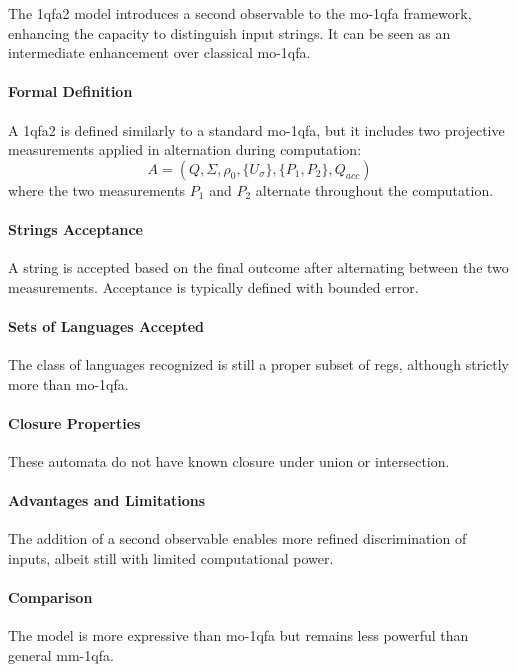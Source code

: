 \subsubsection{}
The \gls{1qfa2} model introduces a second observable to the \gls{mo-1qfa} framework, enhancing the capacity to distinguish input strings. It can be seen as an intermediate enhancement over classical \gls{mo-1qfa}.

\paragraph{Formal Definition}
A \gls{1qfa2} is defined similarly to a standard \gls{mo-1qfa}, but it includes two projective measurements applied in alternation during computation:
\[
A = (Q, \Sigma, \rho_0, \{U_{\sigma}\}, \{P_1, P_2\}, Q_{acc})
\]
where the two measurements \( P_1 \) and \( P_2 \) alternate throughout the computation.

\paragraph{Strings Acceptance}
A string is accepted based on the final outcome after alternating between the two measurements. Acceptance is typically defined with bounded error.

\paragraph{Sets of Languages Accepted}
The class of languages recognized is still a proper subset of \glspl{reg}, although strictly more than \gls{mo-1qfa}.

\paragraph{Closure Properties}
These automata do not have known closure under union or intersection.

\paragraph{Advantages and Limitations}
The addition of a second observable enables more refined discrimination of inputs, albeit still with limited computational power.

\paragraph{Comparison}
The model is more expressive than \gls{mo-1qfa} but remains less powerful than general \gls{mm-1qfa}.

